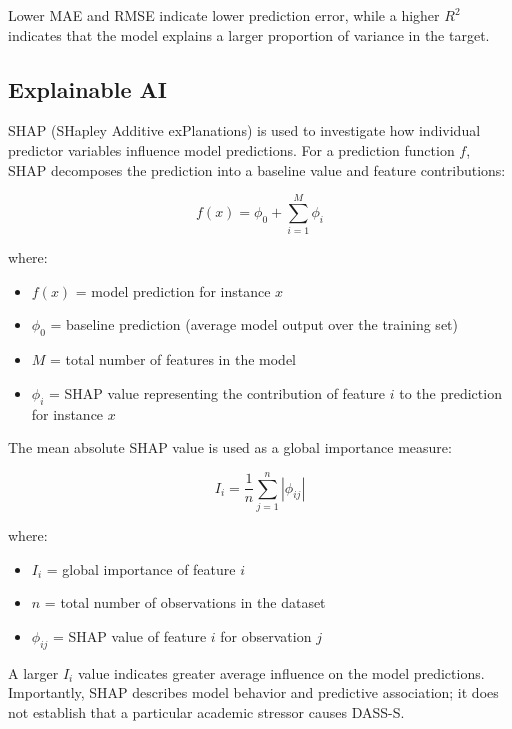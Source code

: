 \documentclass[conference]{IEEEtran}
\begin{document}
Lower MAE and RMSE indicate lower prediction error, while a higher $R^2$ indicates that the model explains a larger proportion of variance in the target.


\subsection{Explainable AI}

SHAP (SHapley Additive exPlanations) is used to investigate how individual predictor variables influence model predictions. For a prediction function $f$, SHAP decomposes the prediction into a baseline value and feature contributions:

\begin{equation}
f(x) = \phi_0 + \sum_{i=1}^{M} \phi_i
\end{equation}

where:
\begin{itemize}
\item $f(x)$ = model prediction for instance $x$
\item $\phi_0$ = baseline prediction (average model output over the training set)
\item $M$ = total number of features in the model
\item $\phi_i$ = SHAP value representing the contribution of feature $i$ to the prediction for instance $x$
\end{itemize}

The mean absolute SHAP value is used as a global importance measure:

\begin{equation}
I_i = \frac{1}{n} \sum_{j=1}^{n} |\phi_{ij}|
\end{equation}

where:
\begin{itemize}
\item $I_i$ = global importance of feature $i$
\item $n$ = total number of observations in the dataset
\item $\phi_{ij}$ = SHAP value of feature $i$ for observation $j$
\end{itemize}

A larger $I_i$ value indicates greater average influence on the model predictions. Importantly, SHAP describes model behavior and predictive association; it does not establish that a particular academic stressor causes DASS-S.


\end{document}
